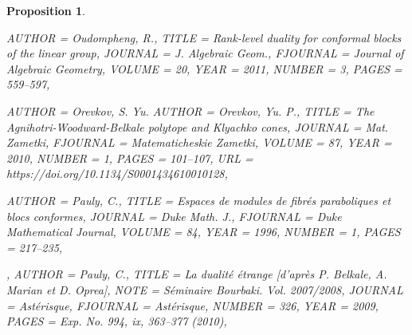 \documentclass[11pt]{amsart}
\newtheorem{proposition}[theorem]{Proposition}
\numberwithin{theorem}{subsection}
\begin{document}
{\begin{proposition}
\begin{bibdiv}
\begin{biblist}
 {
    AUTHOR = {Oudompheng, R.},
     TITLE = {Rank-level duality for conformal blocks of the linear group},
   JOURNAL = {J. Algebraic Geom.},
  FJOURNAL = {Journal of Algebraic Geometry},
    VOLUME = {20},
      YEAR = {2011},
    NUMBER = {3},
     PAGES = {559--597},
}


 {
    AUTHOR = {Orevkov, S. Yu.}
    AUTHOR = {Orevkov, Yu. P.},
     TITLE = {The {A}gnihotri-{W}oodward-{B}elkale polytope and {K}lyachko
              cones},
   JOURNAL = {Mat. Zametki},
  FJOURNAL = {Matematicheskie Zametki},
    VOLUME = {87},
      YEAR = {2010},
    NUMBER = {1},
     PAGES = {101--107},
       URL = {https://doi.org/10.1134/S0001434610010128},
}

 {
    AUTHOR = {Pauly, C.},
     TITLE = {Espaces de modules de fibr\'{e}s paraboliques et blocs conformes},
   JOURNAL = {Duke Math. J.},
  FJOURNAL = {Duke Mathematical Journal},
    VOLUME = {84},
      YEAR = {1996},
    NUMBER = {1},
     PAGES = {217--235},
}

 {,
    AUTHOR = {Pauly, C.},
     TITLE = {La dualit\'{e} \'{e}trange [d'apr\`es {P}. {B}elkale, {A}. {M}arian et
              {D}. {O}prea]},
      NOTE = {S\'{e}minaire Bourbaki. Vol. 2007/2008},
   JOURNAL = {Ast\'{e}risque},
  FJOURNAL = {Ast\'{e}risque},
    NUMBER = {326},
      YEAR = {2009},
     PAGES = {Exp. No. 994, ix, 363--377 (2010)},
}


\end{biblist}
\end{bibdiv}
\end{proposition}}
\end{document}
